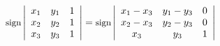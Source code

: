 $
{\mbox{\small sign}}\left|
\begin{array}{ccc}
{x_1} & {y_1} & 1 \\
{x_2} & {y_2} & 1 \\
{x_3} & {y_3} & 1 \\
\end{array}
\right| =
{\mbox{\small sign}}\left|
\begin{array}{ccc}
{x_1 - x_3} & {y_1 - y_3} & 0 \\
{x_2 - x_3} & {y_2 - y_3} & 0 \\
{x_3} & {y_3} & 1 \\
\end{array}
\right|
$

